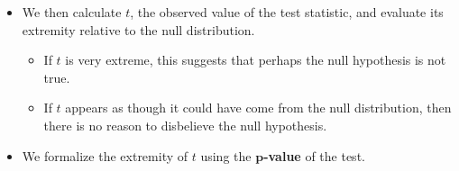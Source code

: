 \begin{itemize}
      \item We then calculate $ t $, the observed value of the test statistic, and evaluate its extremity
            relative to the null distribution.
            \begin{itemize}
                  \item If $ t $ is very extreme, this suggests that perhaps the null hypothesis
                        is not true.
                  \item If $ t $ appears as though it could have come from the null distribution, then
                        there is no reason to disbelieve the null hypothesis.
            \end{itemize}
      \item We formalize the extremity of $ t $ using the \textbf{$ \symbf{p} $-value} of the test.


\end{itemize}
